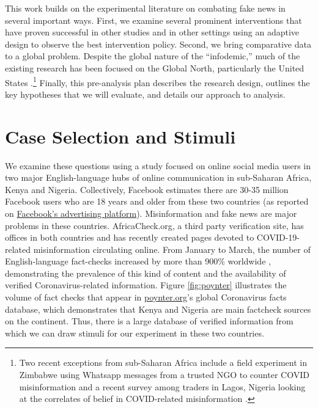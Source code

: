 \documentclass[letterpaper, 12pt, parskip=full,]{scrartcl}
\begin{document}
This work builds on the experimental literature on combating fake news in several important ways. First, we examine several prominent interventions that have proven successful in other studies and in other settings using an adaptive design to observe the best intervention policy. Second, we bring comparative data to a global problem. Despite the global nature of the ``infodemic,'' much of the existing research has been focused on the Global North, particularly the United States \citep{pennycook2020fighting, bursztyn2020misinformation}.\footnote{Two recent exceptions from sub-Saharan Africa include a field experiment in Zimbabwe using Whatsapp messages from a trusted NGO  to counter COVID misinformation \citep{bowles2020center} and a recent survey among traders in Lagos, Nigeria looking at the correlates of belief in COVID-related misinformation \citep{Grossman2020}.} Finally, this pre-analysis plan describes the research design, outlines the key hypotheses that we will evaluate, and details our approach to analysis.




\section{Case Selection and Stimuli}

We examine these questions using a study focused on online social media users in two major English-language hubs of online communication in sub-Saharan Africa, Kenya and Nigeria.  Collectively, Facebook estimates there are 30-35 million Facebook users who are 18 years and older from these two countries (as reported on \href{https://www.facebook.com/business/insights/tools/audience-insights?ref=ens_rdr}{Facebook's advertising platform}). Misinformation and fake news are major problems in these countries. AfricaCheck.org, a third party verification site, has offices in both countries and has recently created pages devoted to COVID-19-related misinformation circulating online. From January to March, the number of English-language fact-checks increased by more than 900\% worldwide \citep{brennen2020types}, demonstrating the prevalence of this kind of content and the availability of verified Coronavirus-related information.  Figure \ref{fig:poynter} illustrates the volume of fact checks that appear in \url{poynter.org}'s global Coronavirus facts database, which demonstrates that Kenya and Nigeria are main factcheck sources on the continent. Thus, there is a large database of verified information from which we can draw stimuli for our experiment in these two countries. 
\end{document}

